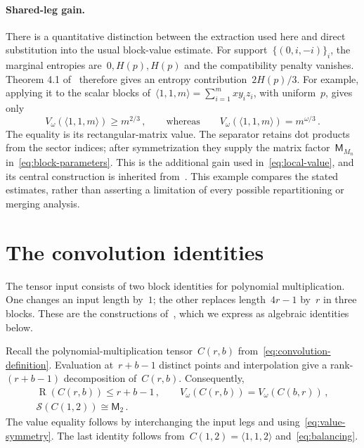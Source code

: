 \documentclass[11pt,letterpaper]{article}
\theoremstyle{definition}
\numberwithin{equation}{section}
\newcommand{\MM}{\mathsf M}
\newcommand{\R}{\operatorname{R}}
\begin{document}
\paragraph{Shared-leg gain.}
There is a quantitative distinction between the extraction used here and direct substitution into the usual block-value estimate. For support~$\{(0,i,-i)\}_i$, the marginal entropies are~$0,H(p),H(p)$ and the compatibility penalty vanishes. Theorem 4.1 of~\cite{LG14} therefore gives an entropy contribution~$2H(p)/3$. For example, applying it to the scalar blocks of~$\langle1,1,m\rangle=\sum_{i=1}^m xy_i z_i$, with uniform~$p$, gives only
\begin{equation*}
 V_\omega(\langle1,1,m\rangle)\geq m^{2/3}\,,
 \qquad\text{whereas}\qquad
 V_\omega(\langle1,1,m\rangle)=m^{\omega/3}\,.
\end{equation*}
The equality is its rectangular-matrix value. The separator retains dot products from the sector indices; after symmetrization they supply the matrix factor~$\MM_{M_n}$ in~\eqref{eq:block-parameters}. This is the additional gain used in~\eqref{eq:local-value}, and its central construction is inherited from~\cite{OpenAI}. This example compares the stated estimates, rather than asserting a limitation of every possible repartitioning or merging analysis.


\section{The convolution identities}\label{sec:convolution}

The tensor input consists of two block identities for polynomial multiplication. One changes an input length by~$1$; the other replaces length~$4r-1$ by~$r$ in three blocks. These are the constructions of~\cite[Sections 3--4]{OpenAI}, which we express as algebraic identities below.

Recall the polynomial-multiplication tensor~$C(r,b)$ from~\eqref{eq:convolution-definition}. Evaluation at~$r+b-1$ distinct points and interpolation give a rank-$(r+b-1)$ decomposition of~$C(r,b)$. Consequently,
\begin{equation}\label{eq:Q}
 \begin{gathered}
 \R(C(r,b))\leq r+b-1\,,\qquad
 V_\omega(C(r,b))=V_\omega(C(b,r))\,,\\
 \mathcal S(C(1,2))\cong\MM_2\,.
 \end{gathered}
\end{equation}
The value equality follows by interchanging the input legs and using~\eqref{eq:value-symmetry}. The last identity follows from~$C(1,2)=\langle1,1,2\rangle$ and~\eqref{eq:balancing}.
\end{document}
